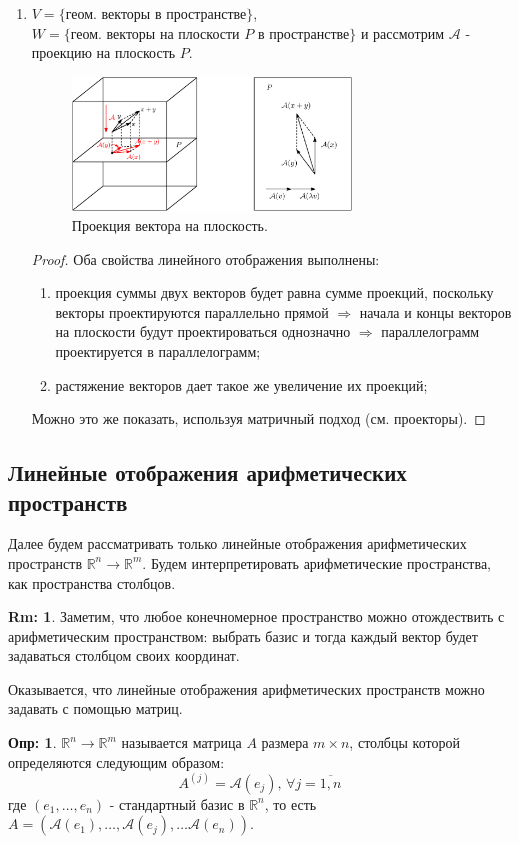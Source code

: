 \documentclass[12pt]{article}
\newcommand{\MR}{\mathbb{R}}
\newcommand{\MA}{\mathcal{A}}
\theoremstyle{definition}
\newtheorem{defn}{Опр:}
\newtheorem{rem}{Rm:}
\begin{document}
\begin{enumerate}[label=(\arabic*)]
	\item $V = \{\text{геом. векторы в пространстве}\}$, $W = \{\text{геом. векторы на плоскости } P \text{ в пространстве}\}$ и рассмотрим $\MA$ - проекцию на плоскость $P$.
	\begin{figure}[H]
		\centering
		\includegraphics[width=0.7\textwidth]{AL1L5_2.eps}
		\caption{Проекция вектора на плоскость.}
		\label{5_2}
	\end{figure}
	\begin{proof}
		Оба свойства линейного отображения выполнены:
		\begin{enumerate}[label=\arabic*)]
			\item проекция суммы двух векторов будет равна сумме проекций, поскольку векторы проектируются параллельно прямой $\Rightarrow$ начала и концы векторов на плоскости будут проектироваться однозначно $\Rightarrow$ параллелограмм проектируется в параллелограмм;
			\item растяжение векторов дает такое же увеличение их проекций;
		\end{enumerate}
		Можно это же показать, используя матричный подход (см. проекторы).
	\end{proof}
\end{enumerate}

\subsection*{Линейные отображения арифметических пространств}
Далее будем рассматривать только линейные отображения арифметических пространств $\MR^n \to \MR^m$. Будем интерпретировать арифметические пространства, как пространства столбцов.
\begin{rem}
	Заметим, что любое конечномерное пространство можно отождествить с арифметическим пространством: выбрать базис и тогда каждый вектор будет задаваться столбцом своих координат.
\end{rem}
Оказывается, что линейные отображения арифметических пространств можно задавать с помощью матриц.
\begin{defn}
	 $\MR^n \to \MR^m$ называется матрица $A$ размера $m \times n$, столбцы которой определяются следующим образом:
	$$
		A^{(j)} = \MA(e_j), \, \forall j = \overline{1,n}
	$$
	где $(e_1, \dotsc, e_n)$ - стандартный базис в $\MR^n$, то есть $A = \left(\MA(e_1),\dotsc, \MA(e_j),\dotsc \MA(e_n)\right)$.
\end{defn}
\end{document}
